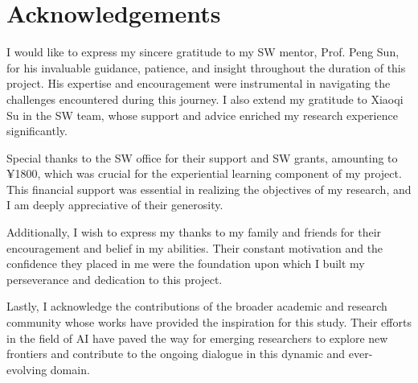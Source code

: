 \documentclass[11pt,a4paper,oneside]{report}
\begin{document}

\chapter*{Acknowledgements}
\label{acknowledgements}

I would like to express my sincere gratitude to my SW mentor, Prof. Peng Sun, 
for his invaluable guidance, patience, and insight throughout the duration of this project.
His expertise and encouragement were instrumental in navigating the challenges encountered during this journey. 
I also extend my gratitude to Xiaoqi Su in the SW team, whose support and advice enriched my research experience significantly.

Special thanks to the SW office for their support and SW grants, amounting to ¥1800, which was crucial for the experiential learning component of my project. 
This financial support was essential in realizing the objectives of my research, and I am deeply appreciative of their generosity.

Additionally, I wish to express my thanks to my family and friends for their encouragement and belief in my abilities. 
Their constant motivation and the confidence they placed in me were the foundation upon which I built my perseverance and dedication to this project.

Lastly, I acknowledge the contributions of the broader academic and research community whose works have provided the inspiration for this study. 
Their efforts in the field of AI have paved the way for emerging researchers to explore new frontiers and contribute to the ongoing dialogue in this dynamic and ever-evolving domain.


\newpage


\setcounter{tocdepth}{1}
\listoffigures\newpage


\end{document}

